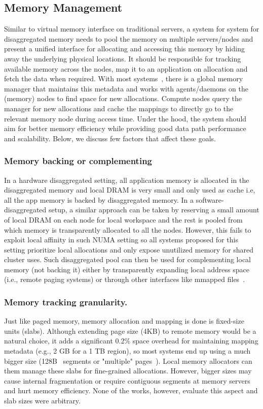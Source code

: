 
\subsection{Memory Management}
Similar to virtual memory interface on traditional servers, a 
system for system for disaggregated memory needs to pool the 
memory on multiple servers/nodes and present a unified interface 
for allocating and accessing this memory by hiding away the 
underlying physical locations. It should be responsible for 
tracking available memory across the nodes, map it to an  
application on allocation and fetch the data when required. 
With most systems~\cite{legoos,remregions,kona}, there is a 
global memory manager that maintains this metadata and works 
with agents/daemons on the (memory) nodes to find space for 
new allocations. Compute nodes query the manager for new allocations 
and cache the mappings to directly go to the relevant memory node 
during access time. Under the hood, the system should aim for better 
memory efficiency while providing good data path performance and 
scalability. Below, we discuss few factors that affect these 
goals.


\subsubsection{Memory backing or complementing}
In a hardware disaggregated setting, all application memory is 
allocated in the disaggregated memory and local DRAM is very small
and only used as cache i.e, all the app memory is backed by 
disaggregated memory. In a software-disaggregated setup, 
a similar approach can be taken by reserving a small amount 
of local DRAM on each node for local workspace and the rest is 
pooled from which memory is transparently allocated to all the 
nodes. However, this fails to exploit local affinity in such 
NUMA setting so all systems proposed for this setting prioritize 
local allocations and only expose unutilized memory for shared 
cluster uses. Such disaggregated pool can then be used for 
complementing local memory (not backing it) either by transparently 
expanding local address space (i.e., remote paging systems) or 
through other interfaces like mmapped files~\cite{remregions}. 


\subsubsection{Memory tracking granularity.}
Just like paged memory, memory allocation and mapping is done 
is fixed-size units (slabs). Although extending page size (4KB) 
to remote memory would be 
a natural choice, it adds a significant 0.2\% space overhead 
for maintaining mapping metadata (e.g., 2 GB for a 1 TB region\cite{remregions}),
so most systems end up using a much bigger size (128B~\cite{remregions}
segments or "multiple" pages~\cite{infiniswap,kona}). Local 
memory allocators can them manage these slabs for 
fine-grained allocations. However, bigger sizes may cause 
internal fragmentation or require contiguous segments at 
memory servers and hurt memory efficiency. None of the works,
however, evaluate this aspect and slab sizes were arbitrary.


